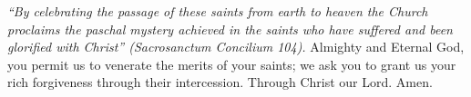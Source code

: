 \pagestyle{empty}
\hspace{0pt}
\vfill

\textit{``By celebrating the passage of these saints from earth
to heaven the Church proclaims the paschal mystery achieved in
the saints who have suffered and been glorified with Christ'' (Sacrosanctum Concilium 104).}
\medbreak
Almighty and Eternal God, you permit us to venerate the merits of your
saints; we ask you to grant us your rich forgiveness through their
intercession. Through Christ our Lord. Amen.
\vfill
\hspace{0pt}
\newpage
